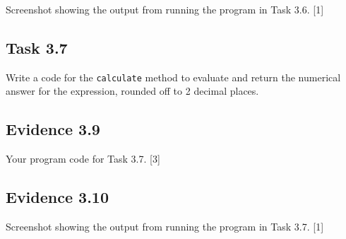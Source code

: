 Screenshot showing the output from running the program in Task 3.6.
\hfill{} {[}1{]}

\subsection*{Task 3.7 }

Write a code for the \texttt{calculate} method to evaluate and return
the numerical answer for the expression, rounded off to 2 decimal
places. 

\subsection*{Evidence 3.9 }

Your program code for Task 3.7. \hfill{}{[}3{]}

\subsection*{Evidence 3.10 }

Screenshot showing the output from running the program in Task 3.7.
\hfill{}{[}1{]}